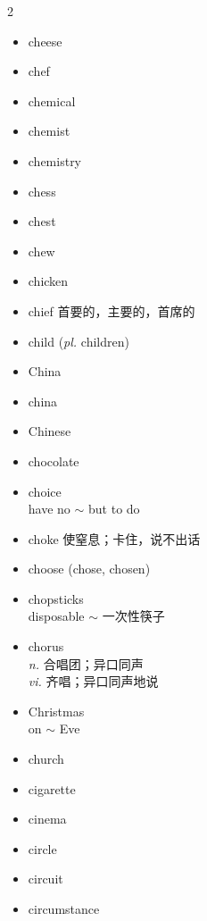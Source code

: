\documentclass[../../book.tex]{subfiles}
\begin{document}
\begin{multicols}{2}
\begin{itemize}
\\cheerful
\item[-] cheese
\item[-] chef
\item[-] chemical
\item[-] chemist
\item[-] chemistry
\item[-] chess
\item[-] chest
\item[-] chew
\item[-] chicken
\item[-] chief 首要的，主要的，首席的
\item[-] child (\emph{pl.} children)
\item[-] China
\item[-] china
\item[-] Chinese
\item[-] chocolate
\item[-] choice
\\have no $\sim$ but to do
\item[-] choke 使窒息；卡住，说不出话
\item[-] choose (chose, chosen)
\item[-] chopsticks
\\disposable $\sim$ 一次性筷子
\item[-] chorus
\\\emph{n.} 合唱团；异口同声
\\\emph{vi.} 齐唱；异口同声地说
\item[-] Christmas
\\on $\sim$ Eve
\item[-] church
\item[-] cigarette
\item[-] cinema
\item[-] circle
\item[-] circuit
\item[-] circumstance
\\
\end{itemize}
\end{multicols}
\end{document}
